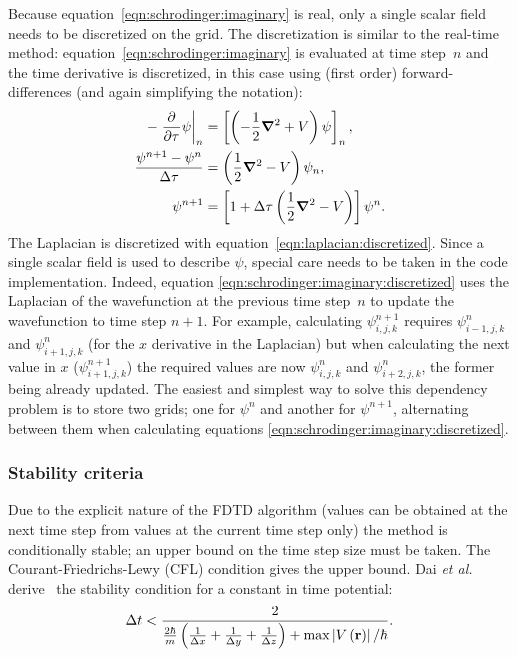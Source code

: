 Because equation~\eqref{eqn:schrodinger:imaginary} is real, only a single scalar
field needs to be discretized on the grid. The discretization is similar to the
real-time method: equation~\eqref{eqn:schrodinger:imaginary} is evaluated at
time step~$n$ and the time derivative is discretized, in this case using (first
order) forward-differences (and again simplifying the notation):
\begin{align}
- \left. \frac{\partial^{{}} }{\partial {\tau}^{{}}} \psi \right|_{n}
    & = \left[  \left( -\frac{1}{2} \bm{\nabla}^2 + V \right) \psi  \right]_{n},
\\
\frac{\psi^{n+1} - \psi^{n}}{\Delta \tau}
    & = \left( \frac{1}{2} \bm{\nabla}^2 - V \right) \psi_{n},
\\
\psi^{n+1} & = \left[ 1 + \Delta \tau \left( \frac{1}{2} \bm{\nabla}^2 - V \right) \right] \psi^{n}.
\label{eqn:schrodinger:imaginary:discretized}
\end{align}
The Laplacian is discretized with equation~\eqref{eqn:laplacian:discretized}.
Since a single scalar field is used to describe $\psi$, special care needs to
be taken in the code implementation. Indeed, equation
\eqref{eqn:schrodinger:imaginary:discretized} uses the Laplacian of the
wavefunction at the previous time step~$n$ to update the wavefunction to
time step $n+1$. For example, calculating $\psi^{n+1}_{i,j,k}$ requires
$\psi^{n}_{i-1,j,k}$ and $\psi^{n}_{i+1,j,k}$ (for the $x$ derivative in the
Laplacian) but when calculating the next value in $x$ ($\psi^{n+1}_{i+1,j,k}$)
the required values are now $\psi^{n}_{i,j,k}$ and $\psi^{n}_{i+2,j,k}$, the
former being already updated. The easiest and simplest way to solve this
dependency problem is to store two grids; one for $\psi^{n}$ and another for
$\psi^{n+1}$, alternating between them when calculating equations
\eqref{eqn:schrodinger:imaginary:discretized}.


\subsubsection{Stability criteria}

Due to the explicit nature of the FDTD algorithm (values can be obtained at the
next time step from values at the current time step only) the method is
conditionally stable; an upper bound on the time step size must be taken. The
Courant-Friedrichs-Lewy (CFL) condition gives the upper bound. Dai \textit{et
al.} derive~\cite{Dai2005} the stability condition for a constant in time
potential:
\begin{align}
\Delta t < \frac{2}{
    \frac{2 \hbar}{m} \left( 
         \frac{1}{\Delta x}
        +\frac{1}{\Delta y}
        +\frac{1}{\Delta z}
         \right)
        + \textrm{max}\left| V\left( \textbf{r} \right) \right| / \hbar
    }.
\end{align}



